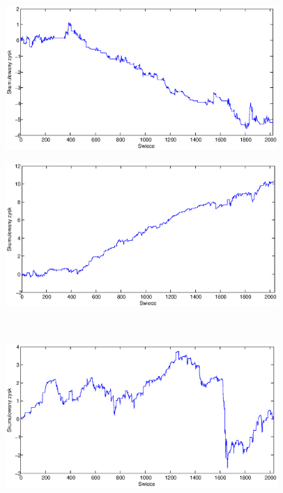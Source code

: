\begin{figure}[h]
\centering
\begin{minipage}{.49\linewidth}
\centering
\includegraphics[width=0.92\textwidth]{images/S1a_silver.eps}
\label{jedno}
\end{minipage}
\begin{minipage}{.49\linewidth}
\centering
\includegraphics[width=0.92\textwidth]{images/S1b_silver.eps}
\label{dwu}
\end{minipage}
\\
\begin{minipage}{.49\linewidth}
\centering
\includegraphics[width=0.92\textwidth]{images/S1c_silver.eps}

\end{minipage}
\end{figure}
